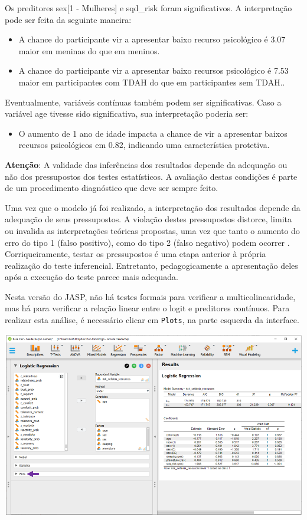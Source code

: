 \documentclass[
]{book}
\providecommand{\tightlist}{%
  \setlength{\itemsep}{0pt}\setlength{\parskip}{0pt}}
\begin{document}
Os preditores sex{[}1 - Mulheres{]} e sqd\_risk foram significativos. A interpretação pode ser feita da seguinte maneira:

\begin{itemize}
\tightlist
\item
  A chance do participante vir a apresentar baixo recurso psicológico é 3.07 maior em meninas do que em meninos.
\item
  A chance do participante vir a apresentar baixo recursos psicológico é 7.53 maior em participantes com TDAH do que em participantes sem TDAH..
\end{itemize}

Eventualmente, variáveis contínuas também podem ser significativas. Caso a variável age tivesse sido significativa, sua interpretação poderia ser:

\begin{itemize}
\tightlist
\item
  O aumento de 1 ano de idade impacta a chance de vir a apresentar baixos recursos psicológicos em 0.82, indicando uma característica protetiva.
\end{itemize}

\textbf{Atenção}: A validade das inferências dos resultados depende da adequação ou não dos pressupostos dos testes estatísticos. A avaliação destas condições é parte de um procedimento diagnóstico que deve ser sempre feito.

Uma vez que o modelo já foi realizado, a interpretação dos resultados depende da adequação de seus pressupostos. A violação destes pressupostos distorce, limita ou invalida as interpretações teóricas propostas, uma vez que tanto o aumento do erro do tipo 1 (falso positivo), como do tipo 2 (falso negativo) podem ocorrer \citep{Lix1996, Barker2015, Ernst2017}. Corriqueiramente, testar os pressupostos é uma etapa anterior à própria realização do teste inferencial. Entretanto, pedagogicamente a apresentação deles após a execução do teste parece mais adequada.

Nesta versão do JASP, não há testes formais para verificar a multicolinearidade, mas há para verificar a relação linear entre o logit e preditores contínuos. Para realizar esta análise, é necessário clicar em \texttt{Plots}, na parte esquerda da interface.

\includegraphics{./img/cap_logistica_assumptions_plot.png}
\end{document}
